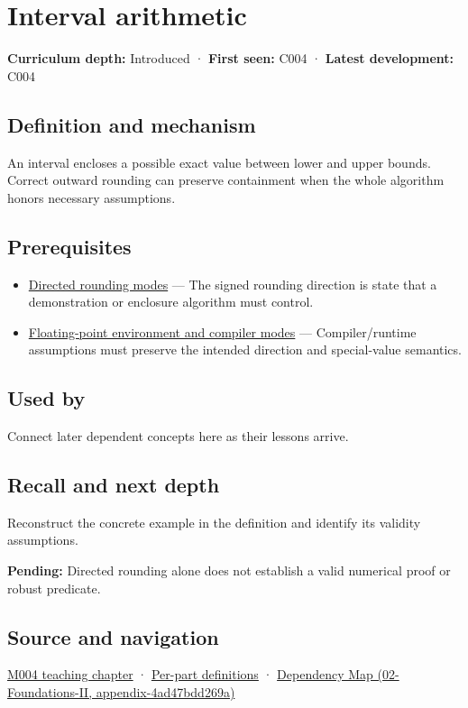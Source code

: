 \hypertarget{appendix-1823a14330cb}{}
\section{Interval arithmetic}\label{appendix-1823a14330cb-interval-arithmetic}

\textbf{Curriculum depth:} Introduced · \textbf{First seen:} C004 · \textbf{Latest development:} C004

\subsection{Definition and mechanism}\label{appendix-1823a14330cb-definition-and-mechanism}

An interval encloses a possible exact value between lower and upper bounds. Correct outward rounding can preserve containment when the whole algorithm honors necessary assumptions.

\subsection{Prerequisites}\label{appendix-1823a14330cb-prerequisites}

\begin{itemize}
\tightlist
\item
  \hyperref[appendix-637d164ae5ca]{Directed rounding modes} --- The signed rounding direction is state that a demonstration or enclosure algorithm must control.
\item
  \hyperref[appendix-f11d1a521253]{Floating-point environment and compiler modes} --- Compiler/runtime assumptions must preserve the intended direction and special-value semantics.
\end{itemize}

\subsection{Used by}\label{appendix-1823a14330cb-used-by}

Connect later dependent concepts here as their lessons arrive.

\subsection{Recall and next depth}\label{appendix-1823a14330cb-recall-and-next-depth}

Reconstruct the concrete example in the definition and identify its validity assumptions.

\textbf{Pending:} Directed rounding alone does not establish a valid numerical proof or robust predicate.

\subsection{Source and navigation}\label{appendix-1823a14330cb-source-and-navigation}

\hyperref[01-foundations-i-ch001-a-stretching-ruler-for-real-valued-quantities]{M004 teaching chapter} · \hyperref[appendix-fd090d982a15-m004---parts-61-76]{Per-part definitions} · \href{../02-Foundations-II/main.pdf\#nameddest=appendix-4ad47bdd269a}{Dependency Map (02-Foundations-II, appendix-4ad47bdd269a)}
